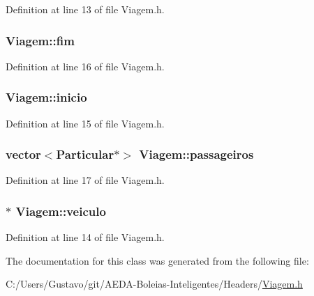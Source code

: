 Definition at line 13 of file Viagem.\+h.

\hypertarget{class_viagem_ab54e61d41be0157f9e75b14c8e06137f}{
\subsubsection[{fim}]{ Viagem\+::fim\hspace{0.3cm}{\ttfamily [private]}}}\label{class_viagem_ab54e61d41be0157f9e75b14c8e06137f}


Definition at line 16 of file Viagem.\+h.

\hypertarget{class_viagem_a0a871b6782ab9b478a530f2c15dc1e32}{
\subsubsection[{inicio}]{ Viagem\+::inicio\hspace{0.3cm}{\ttfamily [private]}}}\label{class_viagem_a0a871b6782ab9b478a530f2c15dc1e32}


Definition at line 15 of file Viagem.\+h.

\hypertarget{class_viagem_a8417361a46610f9fbbd6a7c43b02c149}{
\subsubsection[{passageiros}]{\setlength{\rightskip}{0pt plus 5cm}vector$<${\bf Particular}$\ast$$>$ Viagem\+::passageiros\hspace{0.3cm}{\ttfamily [private]}}}\label{class_viagem_a8417361a46610f9fbbd6a7c43b02c149}


Definition at line 17 of file Viagem.\+h.

\hypertarget{class_viagem_aee9386a44de6b6afb11faff59331f7b5}{
\subsubsection[{veiculo}]{$\ast$ Viagem\+::veiculo\hspace{0.3cm}{\ttfamily [private]}}}\label{class_viagem_aee9386a44de6b6afb11faff59331f7b5}


Definition at line 14 of file Viagem.\+h.



The documentation for this class was generated from the following file\+:\begin{DoxyCompactItemize}
\item 
C\+:/\+Users/\+Gustavo/git/\+A\+E\+D\+A-\/\+Boleias-\/\+Inteligentes/\+Headers/\hyperlink{_viagem_8h}{Viagem.\+h}\end{DoxyCompactItemize}
